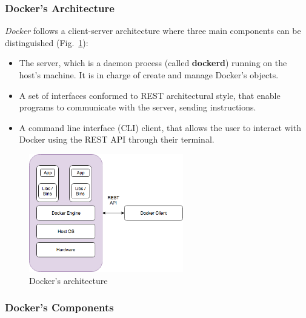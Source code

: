 \documentclass[a4paper,12pt]{article}
\def\myfig#1{Fig.~#1\xspace}
\begin{document}
\subsubsection{Docker's Architecture}

\textit{Docker} follows a client-server architecture where three main components
can be distinguished\cite{docker_architecture}
(\myfig{\ref{fig:docker-architecture}}):
\begin{itemize}
  \item The server, which is a daemon process (called \textbf{dockerd}) running
  on the host's machine. It is in charge of create and manage Docker's objects.
  \item A set of interfaces conformed to REST architectural style, that enable
  programs to communicate with the server, sending instructions.
  \item A command line interface (CLI) client, that allows the user to interact
  with Docker using the REST API through their terminal. 
\end{itemize}   

\begin{figure}[ht!]
  \centerline{\includegraphics[width=0.6\textwidth]{docker_architecture.png}}
  \caption{Docker's architecture}
  \label{fig:docker-architecture}
  \end{figure}

\subsubsection{Docker's Components}
\label{sec:docker_object}
\end{document}
